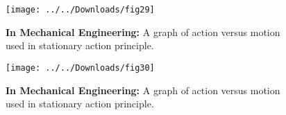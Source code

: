 \documentclass[10pt,a4paper]{article}
\begin{document}
\begin{center}
\begin{figure}
   
    \end{figure}
    \begin{figure}
	\centering
	\texttt{[image: ../../Downloads/fig29]}
	\vspace{1 cm}
	\caption{\textbf{In Mechanical Engineering:} A graph of action versus motion used in stationary action principle.}
	\texttt{[image: ../../Downloads/fig30]}
	\vspace{1 cm}
	\caption{\textbf{In Mechanical Engineering:} A graph of action versus motion used in stationary action principle.}
	
	
 \end{figure}
\end{center}
\end{document}
